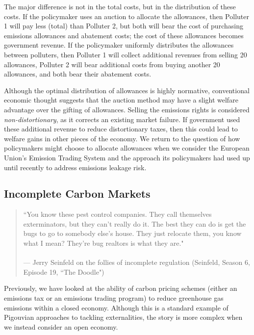 The major difference is not in the total costs, but in the distribution of these costs. If the policymaker uses an auction to allocate the allowances, then Polluter 1 will pay less (total) than Polluter 2, but both will bear the cost of purchasing emissions allowances and abatement costs; the cost of these allowances becomes government revenue. If the policymaker uniformly distributes the allowances between polluters, then Polluter 1 will collect additional revenues from selling 20 allowances, Polluter 2 will bear additional costs from buying another 20 allowances, and both bear their abatement costs. 

Although the optimal distribution of allowances is highly normative, conventional economic thought suggests that the auction method may have a slight welfare advantage over the gifting of allowances. Selling the emissions rights is considered \emph{non-distortionary}, as it corrects an existing market failure. If government used these additional revenue to reduce distortionary taxes, then this could lead to welfare gains in other pieces of the economy. We return to the question of how policymakers might choose to allocate allowances when we consider the European Union's Emission Trading System and the approach its policymakers had used up until recently to address emissions leakage risk.


\subsection{Incomplete Carbon Markets}

\begin{quote}
	``You know these pest control companies. They call themselves exterminators, but they can't really do it. The best they can do is get the bugs to go to somebody else's house. They just relocate them, you know what I mean? They're bug realtors is what they are."\\ \\[-1.8ex]
	--- Jerry Seinfeld on the follies of incomplete regulation (Seinfeld, Season 6, Episode 19, ``The Doodle")
\end{quote}

Previously, we have looked at the ability of carbon pricing schemes (either an emissions tax or an emissions trading program) to reduce greenhouse gas emissions within a closed economy. Although this is a standard example of Pigouvian approaches to tackling externalities, the story is more complex when we instead consider an open economy. 

